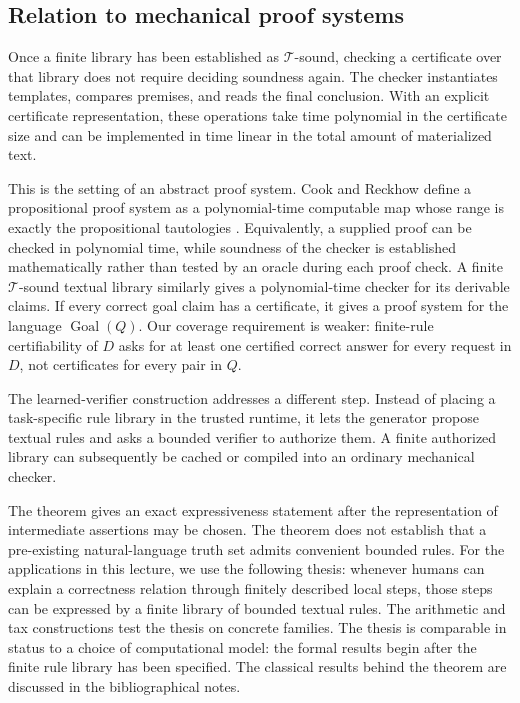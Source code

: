 \documentclass[11pt,twoside]{article}
\theoremstyle{definition}
\newcommand{\True}{\mathcal T}
\newcommand{\Goal}{\operatorname{Goal}}
\begin{document}
\subsection{Relation to mechanical proof systems}

Once a finite library has been established as $\True$-sound, checking a
certificate over that library does not require deciding soundness again. The
checker instantiates templates, compares premises, and reads the final
conclusion. With an explicit certificate representation, these operations take
time polynomial in the certificate size and can be implemented in time linear
in the total amount of materialized text.

This is the setting of an abstract proof system. Cook and Reckhow define a
propositional proof system as a polynomial-time computable map whose range is
exactly the propositional tautologies \cite{cook-reckhow}. Equivalently, a
supplied proof can be checked in polynomial time, while soundness of the
checker is established mathematically rather than tested by an oracle during
each proof check. A finite $\True$-sound textual library similarly gives a
polynomial-time checker for its derivable claims. If every correct goal claim
has a certificate, it gives a proof system for the language $\Goal(Q)$. Our
coverage requirement is weaker: finite-rule certifiability of $D$ asks for at
least one certified correct answer for every request in $D$, not certificates
for every pair in $Q$.

The learned-verifier construction addresses a different step. Instead of
placing a task-specific rule library in the trusted runtime, it lets the
generator propose textual rules and asks a bounded verifier to authorize
them. A finite authorized library can subsequently be cached or compiled into
an ordinary mechanical checker.

The theorem gives an exact expressiveness statement after the representation
of intermediate assertions may be chosen. The theorem does not establish that
a pre-existing natural-language truth set admits convenient bounded rules.
For the applications in this lecture, we use the following thesis: whenever
humans can explain a correctness relation through finitely described local
steps, those steps can be expressed by a finite library of bounded textual
rules. The arithmetic and tax constructions test the thesis on concrete
families. The thesis is comparable in status to a choice of computational
model: the formal results begin after the finite rule library has been
specified. The classical results behind the theorem are discussed in the
bibliographical notes.
\end{document}
